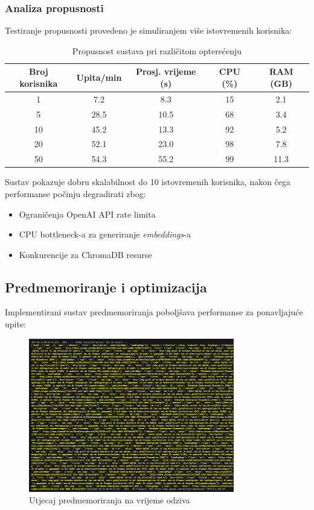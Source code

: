 \subsubsection{Analiza propusnosti}

Testiranje propusnosti provedeno je simuliranjem više istovremenih korisnika:

\begin{table}[htbp]
\centering
\caption{Propusnost sustava pri različitom opterećenju}
\label{tab:throughput_analysis}
\begin{tabular}{|c|c|c|c|c|}
\hline
\textbf{Broj korisnika} & \textbf{Upita/min} & \textbf{Prosj. vrijeme (s)} & \textbf{CPU (\%)} & \textbf{RAM (GB)} \\
\hline
1 & 7.2 & 8.3 & 15 & 2.1 \\
5 & 28.5 & 10.5 & 68 & 3.4 \\
10 & 45.2 & 13.3 & 92 & 5.2 \\
20 & 52.1 & 23.0 & 98 & 7.8 \\
50 & 54.3 & 55.2 & 99 & 11.3 \\
\hline
\end{tabular}
\end{table}

Sustav pokazuje dobru skalabilnost do 10 istovremenih korisnika, nakon čega performanse počinju degradirati zbog:
\begin{itemize}
    \item Ograničenja OpenAI API rate limita
    \item CPU bottleneck-a za generiranje \textit{embeddings}-a
    \item Konkurencije za ChromaDB resurse
\end{itemize}

\subsection{Predmemoriranje i optimizacija}

Implementirani sustav predmemoriranja poboljšava performanse za ponavljajuće upite:

\begin{figure}[htbp]
    \centering
    \includegraphics[width=0.8\textwidth]{figures/izvjestaj_image_66.png}
    \caption{Utjecaj predmemoriranja na vrijeme odziva}
    \label{fig:cache_effectiveness}
\end{figure}

